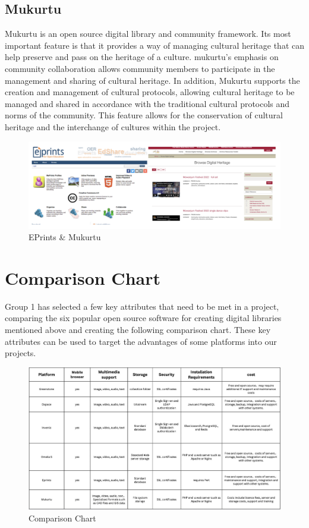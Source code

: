 \subsection{Mukurtu}
Mukurtu is an open source digital library and community framework. Its most important feature is that it provides a way of managing cultural heritage that can help preserve and pass on the heritage of a culture. mukurtu's emphasis on community collaboration allows community members to participate in the management and sharing of cultural heritage. In addition, Mukurtu supports the creation and management of cultural protocols, allowing cultural heritage to be managed and shared in accordance with the traditional cultural protocols and norms of the community. This feature allows for the conservation of cultural heritage and the interchange of cultures within the project.


\begin{figure}[htbp]
  \centerline{\includegraphics[width=500pt]{images/a8.jpg}}
  \caption{EPrints \& Mukurtu}
\end{figure}


\section{Comparison Chart}
Group 1 has selected a few key attributes that need to be met in a project, comparing the six popular open source software for creating digital libraries mentioned above and creating the following comparison chart. These key attributes can be used to target the advantages of some platforms into our projects.

\begin{figure}[htbp]
  \centerline{\includegraphics[width=500pt]{images/a2-1.jpg}}
  \caption{Comparison Chart}
\end{figure}


